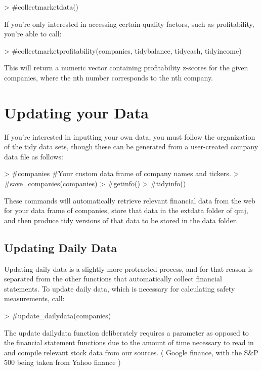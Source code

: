 \documentclass[12pt]{article}
\begin{document}
\begin{Schunk}
\begin{Sinput}
> #collectmarketdata()
\end{Sinput}
\end{Schunk}

If you're only interested in accessing certain quality factors, such as profitability, you're able to call:

\begin{Schunk}
\begin{Sinput}
> #collectmarketprofitability(companies, tidybalance, tidycash, tidyincome)
\end{Sinput}
\end{Schunk}

This will return a numeric vector containing profitability z-scores for the given companies, where the nth number corresponds to the nth company. 

\section*{Updating your Data}
If you're interested in inputting your own data, you must follow the organization of the tidy data sets, though these can be generated from a user-created company data file as follows:

\begin{Schunk}
\begin{Sinput}
> #companies #Your custom data frame of company names and tickers.
> #save_companies(companies)
> #getinfo()
> #tidyinfo()
\end{Sinput}
\end{Schunk}

These commands will automatically retrieve relevant financial data from the web for your data frame of companies, store that data in the extdata folder of qmj, and then produce tidy versions of that data to be stored in the data folder.

\subsection*{Updating Daily Data}
Updating daily data is a slightly more protracted process, and for that reason is separated from the other functions that automatically collect financial statements. To update daily data, which is necessary for calculating safety measurements, call:

\begin{Schunk}
\begin{Sinput}
> #update_dailydata(companies)
\end{Sinput}
\end{Schunk}

The update dailydata function deliberately requires a parameter as opposed to the financial statement functions due to the amount of time necessary to read in and compile relevant stock data from our sources. ( Google finance, with the S\&P 500 being taken from Yahoo finance )
\end{document}
